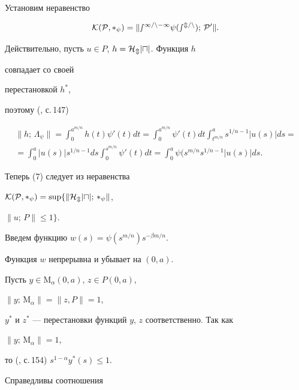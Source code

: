 \begin{pf} Установим неравенство 


\begin{equation} 




\cal K(P,\Lambda_\psi)=\|s^{1/n-1}\psi(s^{m/n});\,P'\|. 


\end{equation} 


Действительно, пусть $u\in P$, $h=\cal H_m|u|$. Функция $h$ 


совпадает со своей 


перестановкой $h^*$, 


поэтому (\cite{Kre}, с.\,147) 


\begin{multline*} 


\|h;\,\Lambda_\psi\| = \int_0^{a^{m/n}}h(t)\psi'(t)dt 


=\int_0^{a^{m/n}}\psi'(t)dt 


\int_{t^{m/n}}^a s^{1/n-1}|u(s)|ds = \\ 


% 


=\int_0^a|u(s)|s^{1/n-1}ds\int_0^{s^{m/n}}\psi'(t)dt= 


\int_0^a\psi(s^{m/n}s^{1/n-1}|u(s)|ds. 


\end{multline*} 


Теперь (7) следует из неравенства 


$\cal K(P,\Lambda_\psi)=\sup\{\|\cal H_m|u|;\,\Lambda_\psi\|$, 


$\|u;\,P\|\le 1\}$. 


 


Введем функцию $w(s)=\psi(s^{m/n})s^{-\beta m/n}$. 


Функция $w$ непрерывна и убывает на $(0,a)$. 


Пусть $y\in\mathrm M_\alpha(0,a)$, $z\in P(0,a)$, 


$\|y;\,\mathrm M_\alpha\|=\|z,P\|=1$, 


$y^*$ и $z^*$ --- перестановки функций $y$, $z$ соответственно. Так как 


$\|y;\,\mathrm M_\alpha\|=1$, 


то (\cite{Kre}, с.\,154) $s^{1-\alpha}y^*(s)\le 1$. 


Справедливы соотношения 


\begin{multline*} 



\end{multline*}
\end{pf}

